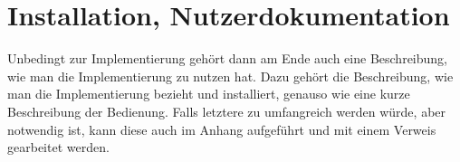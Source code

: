 \section{Installation, Nutzerdokumentation}

Unbedingt zur Implementierung gehört dann am Ende auch eine Beschreibung, wie man die Implementierung zu nutzen hat. Dazu gehört die Beschreibung, wie man die Implementierung bezieht und installiert, genauso wie eine kurze Beschreibung der Bedienung. Falls letztere zu umfangreich werden würde, aber notwendig ist, kann diese auch im Anhang aufgeführt und mit einem Verweis gearbeitet werden.
